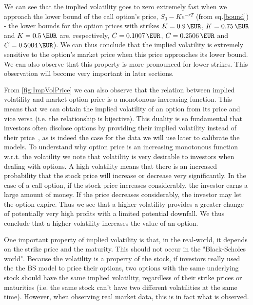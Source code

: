 We can see that the implied volatility goes to zero extremely fast when we approach the lower bound of the call option's price, $S_0-Ke^{-rT}$ (from eq.\eqref{bound}) - the lower bounds for the option prices with strikes $K=\SI{0.9}{\EUR}$, $K=\SI{0.75}{\EUR}$ and $K=\SI{0.5}{\EUR}$ are, respectively, $C=\SI{0.1007}{\EUR}$, $C=\SI{0.2506}{\EUR}$ and $C=\SI{0.5004}{\EUR}$). We can thus conclude that the implied volatility is extremely sensitive to the option's market price when this price approaches its lower bound. We can also observe that this property is more pronounced for lower strikes. This observation will become very important in later sections.

From \autoref{fig:ImpVolPrice} we can also observe that the relation between implied volatility and market option price is a monotonous increasing function.
This means that we can obtain the implied volatility of an option from its price and vice versa (i.e. the relationship is bijective). This duality is so fundamental that investors often disclose options by providing their implied volatility instead of their price~\citep{Wilmott}, as is indeed the case for the data we will use later to calibrate the models.
To understand why option price is an increasing monotonous function w.r.t. the volatility we note that volatility is very desirable to investors when dealing with options. A high volatility means that there is an increased probability that the stock price will increase or decrease very significantly. In the case of a call option, if the stock price increases considerably, the investor earns a large amount of money. If the price decreases considerably, the investor may let the option expire. Thus we see that a higher volatility provides a greater change of potentially very high profits with a limited potential downfall. We thus conclude that a higher volatility increases the value of an option.



One important property of implied volatility is that, in the real-world, it depends on the strike price and the maturity. This should not occur in the "Black-Scholes world". Because the volatility is a property of the stock, if investors really used the the BS model to price their options, two options with the same underlying stock should have the same implied volatility, regardless of their strike prices or maturities (i.e. the same stock can't have two different volatilities at the same time).
However, when observing real market data, this is in fact what is observed.


